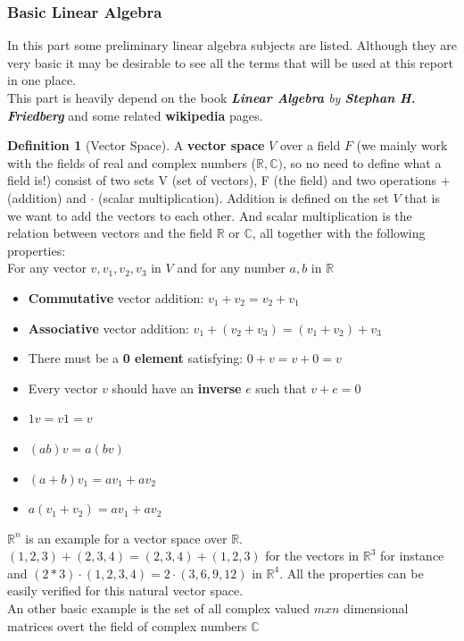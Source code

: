 \documentclass[11pt,a4paper]{article}
\theoremstyle{definition}
\newtheorem{definition}{Definition}[section]
\begin{document}
	\subsubsection{Basic Linear Algebra}
	In this part some preliminary linear algebra subjects are listed. Although they are very basic it may be desirable to see all the terms that will be used at this report in one place. \\
	This part is heavily depend on the book \textit{\textbf{Linear Algebra} by \textbf{Stephan H. Friedberg}} and some related \textbf{wikipedia} pages.
	\begin{definition}[Vector Space]
		A \textbf{vector space} $V$ over a field $F$ (we mainly work with the fields of real and complex numbers ($\mathbb{R},\mathbb{C})$, so no need to define what a field is!) consist of two sets V (set of vectors), F (the field) and two operations + (addition) and $\cdot $ (scalar multiplication). Addition is defined on the set $V$ that is we want to add the vectors to each other. And scalar multiplication is the relation between vectors and the field $\mathbb{R}$ or $\mathbb{C}$, all together with the following properties: \\
		For any vector $v, v_1, v_2, v_3$ in $V$ and for any number $a,b$ in $\mathbb{R}$ 
		\begin{itemize}
			\item \textbf{Commutative} vector addition: $v_1 + v_2 = v_2 + v_1$
			\item \textbf{Associative} vector addition: $v_1 + (v_2 + v_3) = (v_1 + v_2) + v_3$
			\item There must be a \textbf{0 element} satisfying: $0+v = v+0 = v$
			\item Every vector $v$ should have an \textbf{inverse} $e$ such that $ v+e = 0$
			\item $1v = v1 = v$
			\item $(ab)v = a(bv)$
			\item $(a+b)v_1 = av_1 + av_2 $
			\item $a(v_1 + v_2) = av_1 + av_2$
		\end{itemize}
	$ \mathbb{R}^n$ is an example for a vector space over $\mathbb{R}$. $(1,2,3) + (2,3,4) = (2,3,4) + (1,2,3)$ for the vectors in $\mathbb{R}^3$ for instance and $(2*3)\cdot(1,2,3,4) = 2\cdot(3,6,9,12)$ in $\mathbb{R}^4$. All the properties can be easily verified for this natural vector space. \\
	An other basic example is the set of all complex valued $mxn$ dimensional matrices overt the field of complex numbers $\mathbb{C}$
	\end{definition}
\end{document}
